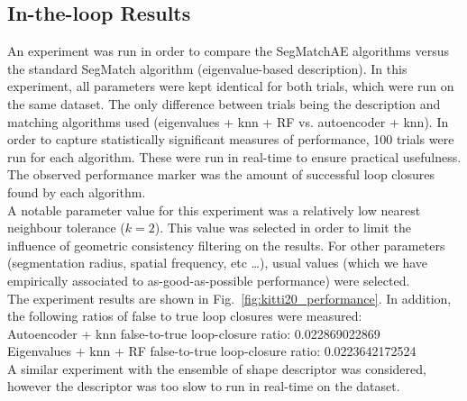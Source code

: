 \subsection{In-the-loop Results}

An experiment was run in order to compare the SegMatchAE algorithms versus the standard SegMatch algorithm (eigenvalue-based description). In this experiment, all parameters were kept identical for both trials, which were run on the same dataset. The only difference between trials being the description and matching algorithms used (eigenvalues + knn + RF vs. autoencoder + knn). In order to capture statistically significant measures of performance, 100 trials were run for each algorithm. These were run in real-time to ensure practical usefulness. The observed performance marker was the amount of successful loop closures found by each algorithm.\\ 

A notable parameter value for this experiment was a relatively low nearest neighbour tolerance ($k=2$). This value was selected in order to limit the influence of geometric consistency filtering on the results. For other parameters (segmentation radius, spatial frequency, etc \ldots), usual values (which we have empirically associated to as-good-as-possible performance) were selected.\\

The experiment results are shown in Fig.~\ref{fig:kitti20_performance}. In addition, the following ratios of false to true loop closures were measured:\\

Autoencoder + knn false-to-true loop-closure ratio: 0.022869022869\\
Eigenvalues + knn + RF false-to-true loop-closure ratio: 0.0223642172524\\

A similar experiment with the ensemble of shape descriptor was considered, however the descriptor was too slow to run in real-time on the dataset.\\

